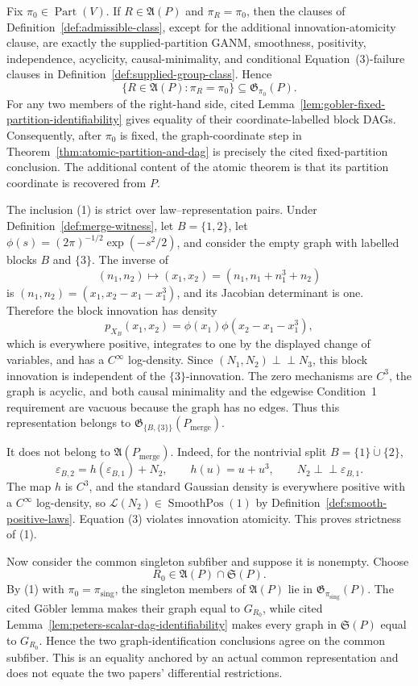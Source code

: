 Fix \(\pi_0\in\operatorname{Part}(V)\). If \(R\in\mathfrak A(P)\) and \(\pi_R=\pi_0\), then the clauses of Definition~\ref{def:admissible-class}, except for the additional innovation-atomicity clause, are exactly the supplied-partition GANM, smoothness, positivity, independence, acyclicity, causal-minimality, and conditional Equation~(3)-failure clauses in Definition~\ref{def:supplied-group-class}. Hence
\[
\{R\in\mathfrak A(P):\pi_R=\pi_0\}
\subseteq \mathfrak G_{\pi_0}(P). \tag{1}
\]
For any two members of the right-hand side, cited Lemma~\ref{lem:gobler-fixed-partition-identifiability} gives equality of their coordinate-labelled block DAGs. Consequently, after \(\pi_0\) is fixed, the graph-coordinate step in Theorem~\ref{thm:atomic-partition-and-dag} is precisely the cited fixed-partition conclusion. The additional content of the atomic theorem is that its partition coordinate is recovered from \(P\).

The inclusion (1) is strict over law--representation pairs. Under Definition~\ref{def:merge-witness}, let \(B=\{1,2\}\), let \(\phi(s)=(2\pi)^{-1/2}\exp(-s^2/2)\), and consider the empty graph with labelled blocks \(B\) and \(\{3\}\). The inverse of
\[
(n_1,n_2)\longmapsto (x_1,x_2)=(n_1,n_1+n_1^3+n_2)
\]
is \((n_1,n_2)=(x_1,x_2-x_1-x_1^3)\), and its Jacobian determinant is one. Therefore the block innovation has density
\[
p_{X_B}(x_1,x_2)=\phi(x_1)\phi(x_2-x_1-x_1^3), \tag{2}
\]
which is everywhere positive, integrates to one by the displayed change of variables, and has a \(C^\infty\) log-density. Since \((N_1,N_2)\perp\!\!\!\perp N_3\), this block innovation is independent of the \(\{3\}\)-innovation. The zero mechanisms are \(C^3\), the graph is acyclic, and both causal minimality and the edgewise Condition~1 requirement are vacuous because the graph has no edges. Thus this representation belongs to \(\mathfrak G_{\{B,\{3\}\}}(P_{\mathrm{merge}})\).

It does not belong to \(\mathfrak A(P_{\mathrm{merge}})\). Indeed, for the nontrivial split \(B=\{1\}\mathbin{\dot\cup}\{2\}\),
\[
\varepsilon_{B,2}=h(\varepsilon_{B,1})+N_2,
\qquad h(u)=u+u^3,
\qquad N_2\perp\!\!\!\perp\varepsilon_{B,1}. \tag{3}
\]
The map \(h\) is \(C^3\), and the standard Gaussian density is everywhere positive with a \(C^\infty\) log-density, so \(\mathcal L(N_2)\in\operatorname{SmoothPos}(1)\) by Definition~\ref{def:smooth-positive-laws}. Equation (3) violates innovation atomicity. This proves strictness of (1).

Now consider the common singleton subfiber and suppose it is nonempty. Choose
\[
R_0\in\mathfrak A(P)\cap\mathfrak S(P).
\]
By (1) with \(\pi_0=\pi_{\mathrm{sing}}\), the singleton members of \(\mathfrak A(P)\) lie in \(\mathfrak G_{\pi_{\mathrm{sing}}}(P)\). The cited Göbler lemma makes their graph equal to \(G_{R_0}\), while cited Lemma~\ref{lem:peters-scalar-dag-identifiability} makes every graph in \(\mathfrak S(P)\) equal to \(G_{R_0}\). Hence the two graph-identification conclusions agree on the common subfiber. This is an equality anchored by an actual common representation and does not equate the two papers' differential restrictions.

